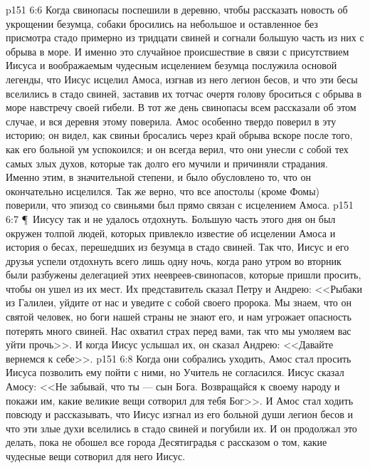 \vs p151 6:6 Когда свинопасы поспешили в деревню, чтобы рассказать новость об укрощении безумца, собаки бросились на небольшое и оставленное без присмотра стадо примерно из тридцати свиней и согнали большую часть из них с обрыва в море. И именно это случайное происшествие в связи с присутствием Иисуса и воображаемым чудесным исцелением безумца послужила основой легенды, что Иисус исцелил Амоса, изгнав из него легион бесов, и что эти бесы вселились в стадо свиней, заставив их тотчас очертя голову броситься с обрыва в море навстречу своей гибели. В тот же день свинопасы всем рассказали об этом случае, и вся деревня этому поверила. Амос особенно твердо поверил в эту историю; он видел, как свиньи бросались через край обрыва вскоре после того, как его больной ум успокоился; и он всегда верил, что они унесли с собой тех самых злых духов, которые так долго его мучили и причиняли страдания. Именно этим, в значительной степени, и было обусловлено то, что он окончательно исцелился. Так же верно, что все апостолы (кроме Фомы) поверили, что эпизод со свиньями был прямо связан с исцелением Амоса.
\vs p151 6:7 \P\ Иисусу так и не удалось отдохнуть. Большую часть этого дня он был окружен толпой людей, которых привлекло известие об исцелении Амоса и история о бесах, перешедших из безумца в стадо свиней. Так что, Иисус и его друзья успели отдохнуть всего лишь одну ночь, когда рано утром во вторник были разбужены делегацией этих неевреев\hyp{}свинопасов, которые пришли просить, чтобы он ушел из их мест. Их представитель сказал Петру и Андрею: <<Рыбаки из Галилеи, уйдите от нас и уведите с собой своего пророка. Мы знаем, что он святой человек, но боги нашей страны не знают его, и нам угрожает опасность потерять много свиней. Нас охватил страх перед вами, так что мы умоляем вас уйти прочь>>. И когда Иисус услышал их, он сказал Андрею: <<Давайте вернемся к себе>>.
\vs p151 6:8 Когда они собрались уходить, Амос стал просить Иисуса позволить ему пойти с ними, но Учитель не согласился. Иисус сказал Амосу: <<Не забывай, что ты --- сын Бога. Возвращайся к своему народу и покажи им, какие великие вещи сотворил для тебя Бог>>. И Амос стал ходить повсюду и рассказывать, что Иисус изгнал из его больной души легион бесов и что эти злые духи вселились в стадо свиней и погубили их. И он продолжал это делать, пока не обошел все города Десятиградья с рассказом о том, какие чудесные вещи сотворил для него Иисус.
